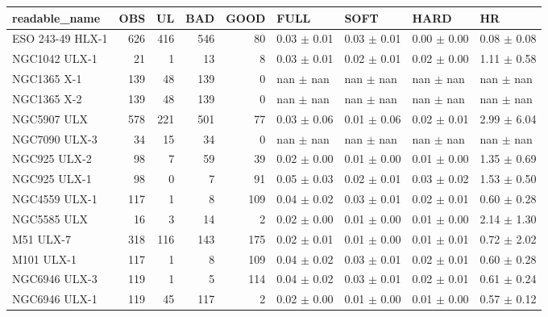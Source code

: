 \begin{tabular}{lrrrrllll}
\toprule
     readable_name &  OBS &  UL &  BAD &  GOOD &                FULL &               SOFT &                HARD &               HR \\
\midrule
  ESO 243-49 HLX-1 &  626 & 416 &  546 &    80 &     0.03 $\pm$ 0.01 &    0.03 $\pm$ 0.01 &     0.00 $\pm$ 0.00 &  0.08 $\pm$ 0.08 \\
     NGC1042 ULX-1 &   21 &   1 &   13 &     8 &     0.03 $\pm$ 0.01 &    0.02 $\pm$ 0.01 &     0.02 $\pm$ 0.00 &  1.11 $\pm$ 0.58 \\
       NGC1365 X-1 &  139 &  48 &  139 &     0 &       nan $\pm$ nan &      nan $\pm$ nan &       nan $\pm$ nan &    nan $\pm$ nan \\
       NGC1365 X-2 &  139 &  48 &  139 &     0 &       nan $\pm$ nan &      nan $\pm$ nan &       nan $\pm$ nan &    nan $\pm$ nan \\
       NGC5907 ULX &  578 & 221 &  501 &    77 &     0.03 $\pm$ 0.06 &    0.01 $\pm$ 0.06 &     0.02 $\pm$ 0.01 &  2.99 $\pm$ 6.04 \\
     NGC7090 ULX-3 &   34 &  15 &   34 &     0 &       nan $\pm$ nan &      nan $\pm$ nan &       nan $\pm$ nan &    nan $\pm$ nan \\
      NGC925 ULX-2 &   98 &   7 &   59 &    39 &     0.02 $\pm$ 0.00 &    0.01 $\pm$ 0.00 &     0.01 $\pm$ 0.00 &  1.35 $\pm$ 0.69 \\
      NGC925 ULX-1 &   98 &   0 &    7 &    91 &     0.05 $\pm$ 0.03 &    0.02 $\pm$ 0.01 &     0.03 $\pm$ 0.02 &  1.53 $\pm$ 0.50 \\
     NGC4559 ULX-1 &  117 &   1 &    8 &   109 &     0.04 $\pm$ 0.02 &    0.03 $\pm$ 0.01 &     0.02 $\pm$ 0.01 &  0.60 $\pm$ 0.28 \\
       NGC5585 ULX &   16 &   3 &   14 &     2 &     0.02 $\pm$ 0.00 &    0.01 $\pm$ 0.00 &     0.01 $\pm$ 0.00 &  2.14 $\pm$ 1.30 \\
         M51 ULX-7 &  318 & 116 &  143 &   175 &     0.02 $\pm$ 0.01 &    0.01 $\pm$ 0.00 &     0.01 $\pm$ 0.01 &  0.72 $\pm$ 2.02 \\
        M101 ULX-1 &  117 &   1 &    8 &   109 &     0.04 $\pm$ 0.02 &    0.03 $\pm$ 0.01 &     0.02 $\pm$ 0.01 &  0.60 $\pm$ 0.28 \\
     NGC6946 ULX-3 &  119 &   1 &    5 &   114 &     0.04 $\pm$ 0.02 &    0.03 $\pm$ 0.01 &     0.02 $\pm$ 0.01 &  0.61 $\pm$ 0.24 \\
     NGC6946 ULX-1 &  119 &  45 &  117 &     2 &     0.02 $\pm$ 0.00 &    0.01 $\pm$ 0.00 &     0.01 $\pm$ 0.00 &  0.57 $\pm$ 0.12 \\

\end{tabular}
